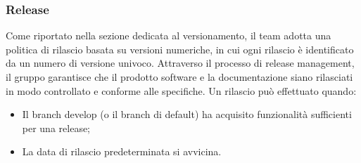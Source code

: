 \subsubsection{Release}
\par Come riportato nella sezione dedicata al versionamento, il team adotta una politica di rilascio basata su versioni numeriche, in cui ogni rilascio è identificato da un numero di versione univoco. Attraverso il processo di release management, il gruppo garantisce che il prodotto software e la documentazione siano rilasciati in modo controllato e conforme alle specifiche. Un rilascio può effettuato quando:
\begin{itemize}
  \item Il branch develop (o il branch di default) ha acquisito funzionalità sufficienti per una release;
  \item La data di rilascio predeterminata si avvicina.
\end{itemize}

